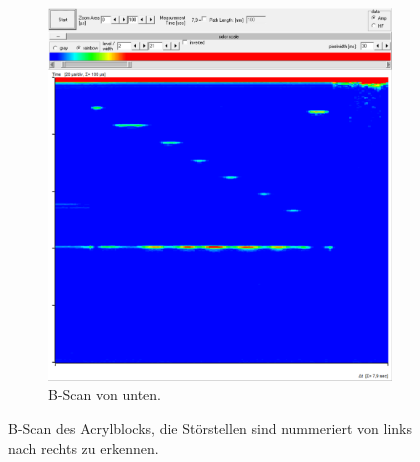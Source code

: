 \begin{figure}
\begin{subfigure}{0.49\columnwidth}
  \includegraphics[width=\textwidth]{pictures/bu.png}
  \caption{B-Scan von unten.}
  \label{fig:bu}
  \end{subfigure}

  \caption{B-Scan des Acrylblocks, die Störstellen sind nummeriert von links nach rechts zu erkennen.}
  \label{fig:b-scan}
\end{figure}

